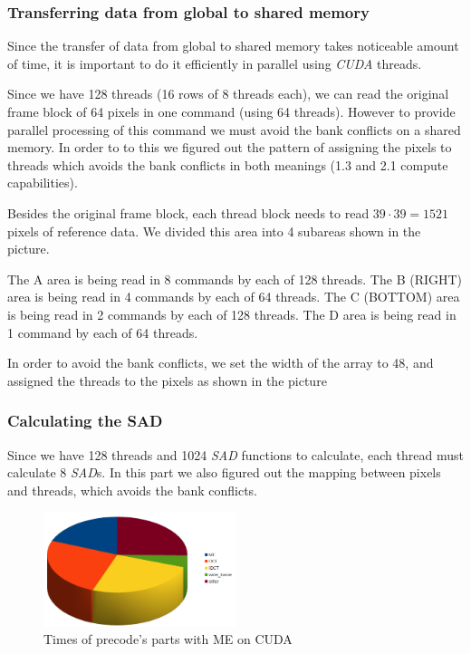 \documentclass[11pt]{article}
\begin{document}
\subsubsection{Transferring data from global to shared memory}
Since the transfer of data from global to shared memory takes noticeable amount
of time, it is important to do it efficiently in parallel using \emph{CUDA}
threads. 

Since we have 128 threads (16 rows of 8 threads each), we can read the
original frame block of 64 pixels in one command (using 64 threads).
However to provide parallel processing of this command we must avoid the bank
conflicts on a shared memory. In order to to this we figured out the pattern
of assigning the pixels to threads which avoids the bank conflicts in both
meanings (1.3 and 2.1 compute capabilities).

Besides the original frame block, each thread block needs to read 
$39 \cdot 39 = 1521$ pixels of reference data. We divided this area into
4 subareas shown in the picture.

The A area is being read in 8 commands by each of 128 threads.
The B (RIGHT) area is being read in 4 commands by each of 64 threads.
The C (BOTTOM) area is being read in 2 commands by each of 128 threads.
The D area is being read in 1 command by each of 64 threads.

In order to avoid the bank conflicts, we set the width of the array to 48,
and assigned the threads to the pixels as shown in the picture

\subsubsection{Calculating the SAD}
Since we have 128 threads and 1024 \emph{SAD} functions to calculate, each
thread must calculate 8 \emph{SAD}s. In this part we also figured out the
mapping between pixels and threads, which avoids the bank conflicts.

\begin{figure}[h]
\centering
\includegraphics[width=0.5\textwidth]{images/cuda_me.png}
\caption{Times of precode's parts with ME on CUDA}
\end{figure}
\end{document}
